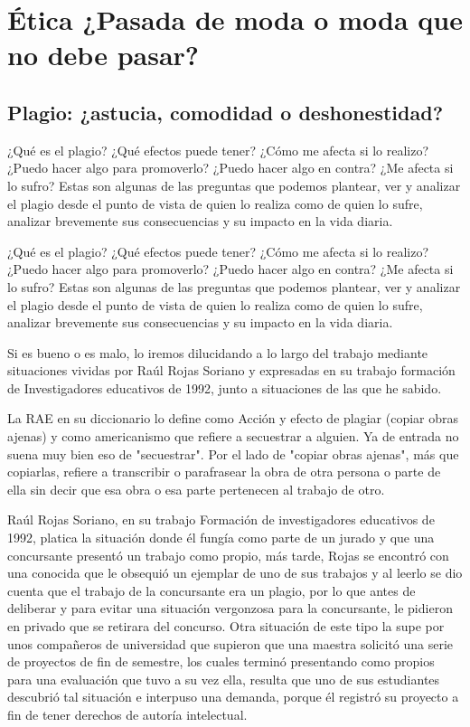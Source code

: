 \chapter{Ética ¿Pasada de moda o moda que no debe pasar?}

\section{Plagio: ¿astucia, comodidad o deshonestidad?}
¿Qué es el plagio? ¿Qué efectos puede tener? ¿Cómo me afecta si lo realizo? ¿Puedo hacer algo para promoverlo? ¿Puedo hacer algo en contra? ¿Me afecta si lo sufro? Estas son algunas de las preguntas que podemos plantear, ver y analizar el plagio desde el punto de vista de quien lo realiza como de quien lo sufre, analizar brevemente sus consecuencias y su impacto en la vida diaria.

¿Qué es el plagio? ¿Qué efectos puede tener? ¿Cómo me afecta si lo realizo? ¿Puedo hacer algo para promoverlo? ¿Puedo hacer algo en contra? ¿Me afecta si lo sufro? Estas son algunas de las preguntas que podemos plantear, ver y analizar el plagio desde el punto de vista de quien lo realiza como de quien lo sufre, analizar brevemente sus consecuencias y su impacto en la vida diaria.

Si es bueno o es malo, lo iremos dilucidando a lo largo del trabajo mediante situaciones vividas por Raúl Rojas Soriano y expresadas en su trabajo formación de Investigadores educativos de 1992, junto a situaciones de las que he sabido.

La RAE en su diccionario lo define como Acción y efecto de plagiar (copiar obras ajenas) y como americanismo que refiere a secuestrar a alguien. Ya de entrada no suena muy bien eso de "secuestrar". Por el lado de "copiar obras ajenas", más que copiarlas, refiere a transcribir o parafrasear la obra de otra persona o parte de ella sin decir que esa obra o esa parte pertenecen al trabajo de otro.

Raúl Rojas Soriano, en su trabajo Formación de investigadores educativos de 1992, platica la situación donde él fungía como parte de un jurado y que una concursante presentó un trabajo como propio, más tarde, Rojas se encontró con una conocida que le obsequió un ejemplar de uno de sus trabajos y al leerlo se dio cuenta que el trabajo de la concursante era un plagio, por lo que antes de deliberar y para evitar una situación vergonzosa para la concursante, le pidieron en privado que se retirara del concurso. Otra situación de este tipo la supe por unos compañeros de universidad que supieron que una maestra solicitó una serie de proyectos de fin de semestre, los cuales terminó presentando como propios para una evaluación que tuvo a su vez ella, resulta que uno de sus estudiantes descubrió tal situación e interpuso una demanda, porque él registró su proyecto a fin de tener derechos de autoría intelectual.

